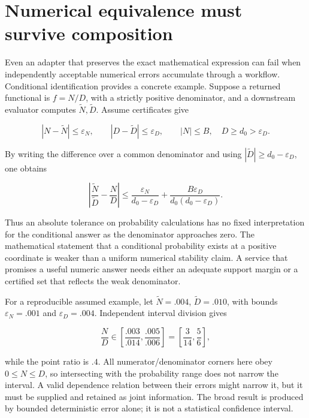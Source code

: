 \hypertarget{numerical-equivalence-must-survive-composition}{%
\section{Numerical equivalence must survive
composition}\label{numerical-equivalence-must-survive-composition}}

Even an adapter that preserves the exact mathematical expression can
fail when independently acceptable numerical errors accumulate through a
workflow. Conditional identification provides a concrete example.
Suppose a returned functional is \(f=N/D\), with a strictly positive
denominator, and a downstream evaluator computes
\(\widetilde N,\widetilde D\). Assume certificates give

\[
 |N-\widetilde N|\leq\varepsilon_N,\qquad
 |D-\widetilde D|\leq\varepsilon_D,
 \qquad |N|\leq B,\quad D\geq d_0>\varepsilon_D.
\]

By writing the difference over a common denominator and using
\(|\widetilde D|\geq d_0-\varepsilon_D\), one obtains

\[
 \left|\frac{\widetilde N}{\widetilde D}-\frac ND\right|
 \leq\frac{\varepsilon_N}{d_0-\varepsilon_D}
 +\frac{B\varepsilon_D}{d_0(d_0-\varepsilon_D)}.
\]

Thus an absolute tolerance on probability calculations has no fixed
interpretation for the conditional answer as the denominator approaches
zero. The mathematical statement that a conditional probability exists
at a positive coordinate is weaker than a uniform numerical stability
claim. A service that promises a useful numeric answer needs either an
adequate support margin or a certified set that reflects the weak
denominator.

For a reproducible assumed example, let \(\widetilde N=.004\),
\(\widetilde D=.010\), with bounds \(\varepsilon_N=.001\) and
\(\varepsilon_D=.004\). Independent interval division gives

\[
 \frac ND\in\left[\frac{.003}{.014},\frac{.005}{.006}\right]
 =\left[\frac3{14},\frac56\right],
\]

while the point ratio is \(.4\). All numerator/denominator corners here
obey \(0\leq N\leq D\), so intersecting with the probability range does
not narrow the interval. A valid dependence relation between their
errors might narrow it, but it must be supplied and retained as joint
information. The broad result is produced by bounded deterministic error
alone; it is not a statistical confidence interval.
\citep{exec13_interchange_composition}

